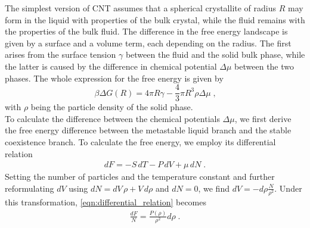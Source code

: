 The simplest version of CNT assumes that a spherical crystallite of radius $R$ may form in the liquid with properties of the bulk crystal, while the fluid remains with the properties of the bulk fluid. The difference in the free energy landscape is given by a surface and a volume term, each depending on the radius. The first arises from the surface tension $\gamma$ between the fluid and the solid bulk phase, while the latter is caused by the difference in chemical potential $\Delta \mu$ between the two phases. The whole expression for the free energy is given by
\begin{equation}
\label{eqn:free_energy}
\beta \Delta G(R) =4 \pi R \gamma -\frac{4}{3} \pi R^3 \rho \Delta \mu  \; \text{,}
\end{equation}
with $\rho$ being the particle density of the solid phase.\\

To calculate the difference between the chemical potentials $\Delta \mu $, we first derive the free energy difference between the metastable liquid branch and the stable coexistence branch. To calculate the free energy, we employ its differential relation
\begin{align}
\label{eqn:differential_relation}
dF = -S  \, dT -P \, dV + \mu  \, dN \; \text{.}
\end{align}
Setting the number of particles and the temperature constant and further reformulating $dV$ using \linebreak[1] $dN = dV  \, \rho + V  \, d\rho  $ and $dN = 0 $, we find $ dV = -d\rho \frac{N}{\rho^2}$. Under this transformation, \autoref{eqn:differential_relation} becomes
\begin{align}
\label{eqn:df_relation}
\frac{dF}{N} = \frac{P(\rho)}{\rho^2} d\rho \; \text{.}
\end{align}

